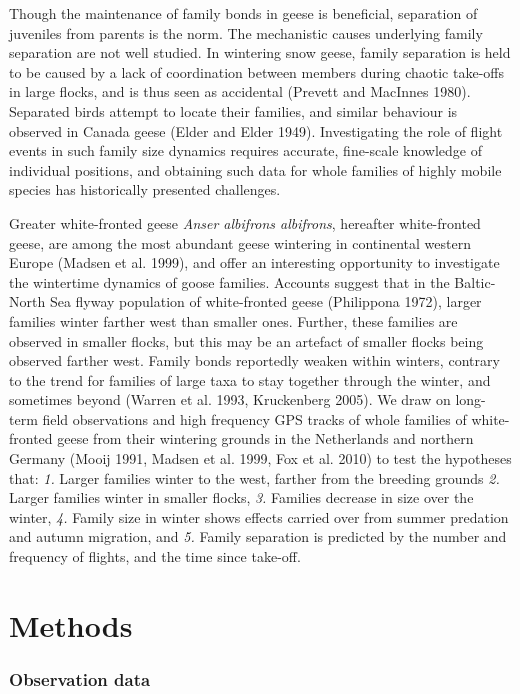 \documentclass[10pt,twocolumn]{paper}
\begin{document}
Though the maintenance of family bonds in geese is beneficial,
separation of juveniles from parents is the norm. The mechanistic causes
underlying family separation are not well studied. In wintering snow
geese, family separation is held to be caused by a lack of coordination
between members during chaotic take-offs in large flocks, and is thus
seen as accidental (Prevett and MacInnes 1980). Separated birds attempt
to locate their families, and similar behaviour is observed in Canada
geese (Elder and Elder 1949). Investigating the role of flight events in
such family size dynamics requires accurate, fine-scale knowledge of
individual positions, and obtaining such data for whole families of
highly mobile species has historically presented challenges.

Greater white-fronted geese \emph{Anser albifrons albifrons}, hereafter
white-fronted geese, are among the most abundant geese wintering in
continental western Europe (Madsen et al. 1999), and offer an
interesting opportunity to investigate the wintertime dynamics of goose
families. Accounts suggest that in the Baltic-North Sea flyway
population of white-fronted geese (Philippona 1972), larger families
winter farther west than smaller ones. Further, these families are
observed in smaller flocks, but this may be an artefact of smaller
flocks being observed farther west. Family bonds reportedly weaken
within winters, contrary to the trend for families of large taxa to stay
together through the winter, and sometimes beyond (Warren et al. 1993,
Kruckenberg 2005). We draw on long-term field observations and high
frequency GPS tracks of whole families of white-fronted geese from their
wintering grounds in the Netherlands and northern Germany (Mooij 1991,
Madsen et al. 1999, Fox et al. 2010) to test the hypotheses that:
\emph{1.} Larger families winter to the west, farther from the breeding
grounds \emph{2.} Larger families winter in smaller flocks, \emph{3.}
Families decrease in size over the winter, \emph{4.} Family size in
winter shows effects carried over from summer predation and autumn
migration, and \emph{5.} Family separation is predicted by the number
and frequency of flights, and the time since take-off.

\section{Methods}\label{methods}

\subsubsection{Observation data}\label{observation-data}
\end{document}
